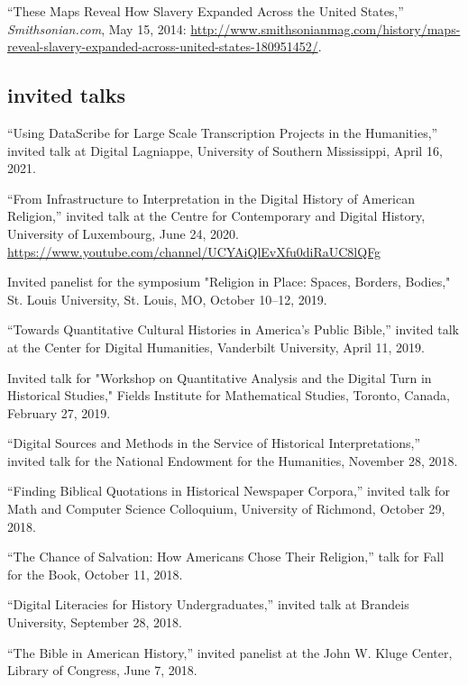 \documentclass[11pt]{article}
\begin{document}
``These Maps Reveal How Slavery Expanded Across the United States,''
\emph{Smithsonian.com}, May 15, 2014:
\url{http://www.smithsonianmag.com/history/maps-reveal-slavery-expanded-across-united-states-180951452/}.



\subsection{invited talks}\label{invited-talks}

``Using DataScribe for Large Scale Transcription Projects in the Humanities,'' invited talk at Digital Lagniappe, University of Southern Mississippi, April 16, 2021.

``From Infrastructure to Interpretation in the Digital History of American Religion,'' invited talk at the Centre for Contemporary and Digital History, University of Luxembourg, June 24, 2020. \url{https://www.youtube.com/channel/UCYAiQlEvXfu0diRaUC8lQFg}

Invited panelist for the symposium "Religion in Place: Spaces, Borders, Bodies," St. Louis University, St. Louis, MO, October 10--12, 2019.

``Towards Quantitative Cultural Histories in America's Public Bible,'' invited talk at the Center for Digital Humanities, Vanderbilt University, April 11, 2019.

Invited talk for "Workshop on Quantitative Analysis and the Digital Turn in Historical Studies," Fields Institute for Mathematical Studies, Toronto, Canada, February 27, 2019.

``Digital Sources and Methods in the Service of Historical Interpretations,'' 
invited talk for the National Endowment for the Humanities, November 28, 
2018.

``Finding Biblical Quotations in Historical Newspaper Corpora,'' invited talk for Math and Computer Science Colloquium, University of Richmond, October 29, 2018.

``The Chance of Salvation: How Americans Chose Their Religion,'' talk for Fall for the Book, October 11, 2018.

``Digital Literacies for History Undergraduates,'' invited talk at Brandeis University, September 28, 2018.

``The Bible in American History,'' invited panelist at the John W. Kluge Center, Library of Congress, June 7, 2018.
\end{document}
